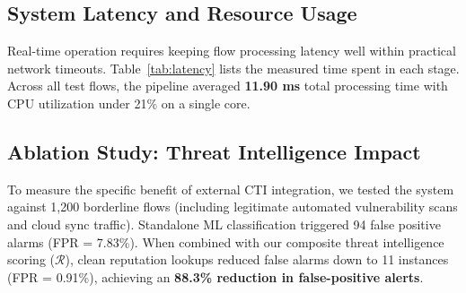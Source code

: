 \documentclass[conference]{IEEEtran}
\begin{document}
\subsection{System Latency and Resource Usage}
Real-time operation requires keeping flow processing latency well within practical network timeouts. Table~\ref{tab:latency} lists the measured time spent in each stage. Across all test flows, the pipeline averaged \textbf{11.90 ms} total processing time with CPU utilization under 21\% on a single core.

\begin{table}[htbp]
\caption{Latency Breakdown by Processing Stage}
\label{tab:latency}
\centering
\small
{}
\end{table}

\subsection{Ablation Study: Threat Intelligence Impact}
To measure the specific benefit of external CTI integration, we tested the system against 1,200 borderline flows (including legitimate automated vulnerability scans and cloud sync traffic). Standalone ML classification triggered 94 false positive alarms (FPR = 7.83\%). When combined with our composite threat intelligence scoring ($\mathcal{R}$), clean reputation lookups reduced false alarms down to 11 instances (FPR = 0.91\%), achieving an \textbf{88.3\% reduction in false-positive alerts}.

\end{document}
